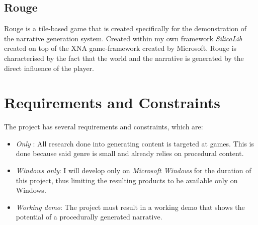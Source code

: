 \subsection{Rouge}
Rouge is a \rogue tile-based game that is created specifically for the demonstration of the \diage narrative generation system.
Created within my own framework \textit{SilicaLib} created on top of the XNA game-framework created by Microsoft.
Rouge is characterised by the fact that the world and the narrative is generated by the direct influence of the player.

\section{Requirements and Constraints}
The project has several requirements and constraints, which are:
\begin{itemize}
\item \textit{Only} \rogue:		All research done into generating content is targeted at \rogue games. This is done because said genre is small and already relies on procedural content.
\item \textit{Windows only}: 	I will develop only on \textit{Microsoft Windows} for the duration of this project, thus limiting the resulting products to be available only on Windows.
\item \textit{Working demo}: 	The project must result in a working demo that shows the potential of a procedurally generated narrative.
\end{itemize}